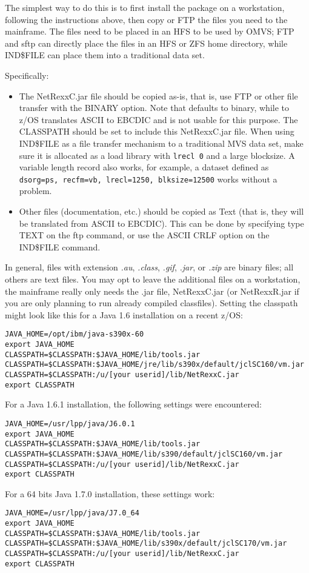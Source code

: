 The simplest way to do this is to first install the package on a
workstation, following the instructions above, then copy or FTP the
files you need to the mainframe.  The files need to be placed in an
HFS to be used by OMVS; FTP and sftp can directly place the files in
an HFS or ZFS
home directory, while IND\$FILE can place them into a traditional data
set.

Specifically:
\begin{itemize}
\item The NetRexxC.jar file should be copied as-is, that is, use
FTP or other file transfer with the BINARY option.  Note that
 defaults to binary, while  to z/OS translates
ASCII to EBCDIC and is not usable for this purpose. The CLASSPATH should
be set to include this NetRexxC.jar file. When using IND\$FILE as a
file transfer mechanism to a traditional MVS data set, make sure it is
allocated as a load library with \texttt{lrecl 0} and a large
blocksize. A variable length record also works, for example, a dataset
defined as \texttt{dsorg=ps, recfm=vb, lrecl=1250, blksize=12500}
works without a problem.
\item Other files (documentation, etc.) should be copied as Text (that is,
they will be translated from ASCII to EBCDIC). This can be done by specifying type TEXT on the ftp
command, or use the ASCII CRLF option on the IND\$FILE command.
\end{itemize}

In general, files with extension \emph{.au}, \emph{.class}, \emph{.gif}, \emph{.jar},
or \emph{.zip} are binary files; all others are text files. You may
opt to leave the additional files on a workstation, the mainframe
really only needs the .jar file, NetRexxC.jar (or NetRexxR.jar if you
are only planning to run already compiled classfiles).
Setting the classpath might look like this for a Java 1.6 installation
on a recent z/OS:
\begin{verbatim}
JAVA_HOME=/opt/ibm/java-s390x-60
export JAVA_HOME
CLASSPATH=$CLASSPATH:$JAVA_HOME/lib/tools.jar
CLASSPATH=$CLASSPATH:$JAVA_HOME/jre/lib/s390x/default/jclSC160/vm.jar
CLASSPATH=$CLASSPATH:/u/[your userid]/lib/NetRexxC.jar
export CLASSPATH
\end{verbatim}
For a Java 1.6.1 installation, the following settings were
encountered:
\begin{verbatim}
JAVA_HOME=/usr/lpp/java/J6.0.1
export JAVA_HOME
CLASSPATH=$CLASSPATH:$JAVA_HOME/lib/tools.jar
CLASSPATH=$CLASSPATH:$JAVA_HOME/lib/s390/default/jclSC160/vm.jar
CLASSPATH=$CLASSPATH:/u/[your userid]/lib/NetRexxC.jar
export CLASSPATH
\end{verbatim}
For a 64 bits Java 1.7.0 installation, these settings work:
\begin{verbatim}
JAVA_HOME=/usr/lpp/java/J7.0_64
export JAVA_HOME
CLASSPATH=$CLASSPATH:$JAVA_HOME/lib/tools.jar
CLASSPATH=$CLASSPATH:$JAVA_HOME/lib/s390x/default/jclSC170/vm.jar
CLASSPATH=$CLASSPATH:/u/[your userid]/lib/NetRexxC.jar
export CLASSPATH
\end{verbatim}

